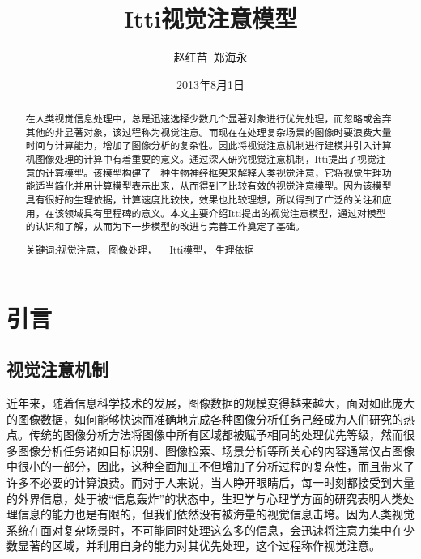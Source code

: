 \documentclass[a4paper,10pt]{article}\large
\title{Itti视觉注意模型}
\author{赵红苗\ 郑海永}
\date{2013年8月1日}
\begin{document}
\maketitle

\begin{abstract} 

在人类视觉信息处理中，总是迅速选择少数几个显著对象进行优先处理，而忽略或舍弃其他的非显著对象，该过程称为视觉注意。而现在在处理复杂场景的图像时要浪费大量时间与计算能力，增加了图像分析的复杂性。因此将视觉注意机制进行建模并引入计算机图像处理的计算中有着重要的意义。通过深入研究视觉注意机制，Itti提出了视觉注意的计算模型。该模型构建了一种生物神经框架来解释人类视觉注意，它将视觉生理功能适当简化并用计算模型表示出来，从而得到了比较有效的视觉注意模型。因为该模型具有很好的生理依据，计算速度比较快，效果也比较理想，所以得到了广泛的关注和应用，在该领域具有里程碑的意义。本文主要介绍Itti提出的视觉注意模型，通过对模型的认识和了解，从而为下一步模型的改进与完善工作奠定了基础。


\begin{description}
\item[关键词:视觉注意，  图像处理，  　Itti模型，  生理依据]
\end{description}

\end{abstract}

\newpage
\tableofcontents 
\newpage
\section{引言}
\subsection{视觉注意机制}

近年来，随着信息科学技术的发展，图像数据的规模变得越来越大，面对如此庞大的图像数据，如何能够快速而准确地完成各种图像分析任务己经成为人们研究的热点。传统的图像分析方法将图像中所有区域都被赋予相同的处理优先等级，然而很多图像分析任务诸如目标识别、图像检索、场景分析等所关心的内容通常仅占图像中很小的一部分，因此，这种全面加工不但增加了分析过程的复杂性，而且带来了许多不必要的计算浪费。而对于人来说，当人睁开眼睛后，每一时刻都接受到大量的外界信息，处于被“信息轰炸”的状态中，生理学与心理学方面的研究表明人类处理信息的能力也是有限的，但我们依然没有被海量的视觉信息击垮。因为人类视觉系统在面对复杂场景时，不可能同时处理这么多的信息，会迅速将注意力集中在少数显著的区域，并利用自身的能力对其优先处理，这个过程称作视觉注意。
\end{document}

